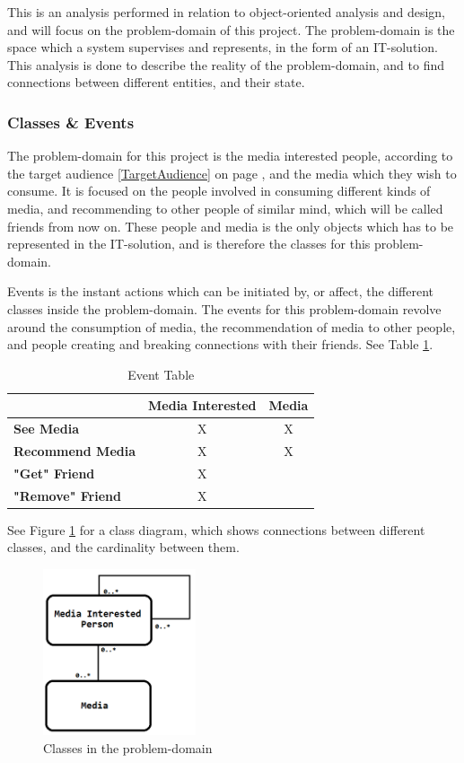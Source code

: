 This is an analysis performed in relation to object-oriented analysis and design, and will focus on the problem-domain of this project. The problem-domain is the space which a system supervises and represents, in the form of an IT-solution. This analysis is done to describe the reality of the problem-domain, and to find connections between different entities, and their state.

\subsubsection{Classes \& Events}

The problem-domain for this project is  the media interested people, according to the target audience \ref{TargetAudience} on page \pageref{TargetAudience}, and the media which they wish to consume. It is focused on the people involved in consuming different kinds of media, and recommending to other people of similar mind, which will be called friends from now on. These people and media is the only objects which has to be represented in the IT-solution, and is therefore the classes for this problem-domain.

Events is the instant actions which can be initiated by, or affect, the different classes inside the problem-domain. The events for this problem-domain revolve around the consumption of media, the recommendation of media to other people, and people creating and breaking connections with their friends. See Table \ref{EventTable}.

\begin{table}[htb]
\centering
\begin{tabular}{|l|c|c|} \hline
	  & \textbf{Media Interested} & \textbf{Media} \\ \hline
	\textbf{See Media} & X & X \\ \hline
	\textbf{Recommend Media} & X & X \\ \hline
	\textbf{"Get" Friend} & X &  \\ \hline
	\textbf{"Remove" Friend} & X &  \\ \hline
\end{tabular}
\caption{Event Table}
\label{EventTable}
\end{table}

See Figure \ref{ClassDiagram} for a class diagram, which shows connections between different classes, and the cardinality between them.

\begin{figure}[htb]
\centering
\includegraphics[width=0.4\textwidth]{Images/classdiagram.png}
\caption{Classes in the problem-domain}
\label{ClassDiagram}
\end{figure}

